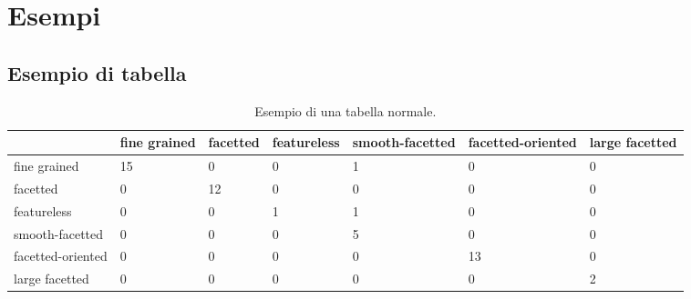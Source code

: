\chapter{Esempi}

\section{Esempio di tabella}

\begin{table}
    \centering
    \begin{tabular}{| m{1.8cm} ||m{1.8cm}|m{1.8cm}|m{1.8cm}|m{1.8cm}|m{1.8cm}|m{1.8cm}|}
    \hline
         &  fine grained & facetted & featureless & smooth-facetted & facetted-oriented & large facetted\\
    \hline\hline
        fine grained      & 15 & 0 & 0 & 1 & 0 & 0\\
        \hline
        facetted          & 0  & 12 & 0 & 0 & 0 & 0 \\[3ex]
        \hline
        featureless       & 0 & 0 & 1 & 1 & 0  & 0\\[3ex]
        \hline
        smooth-facetted   & 0 & 0 & 0 & 5 & 0 & 0 \\
        \hline
        facetted-oriented & 0 & 0 & 0 & 0 & 13 & 0\\
        \hline
        large facetted    & 0 & 0 & 0 & 0 & 0  & 2\\
        \hline
         
    \end{tabular}
    \caption{Esempio di una tabella normale.}
    \label{tab:riferimento a tabella}
\end{table}

